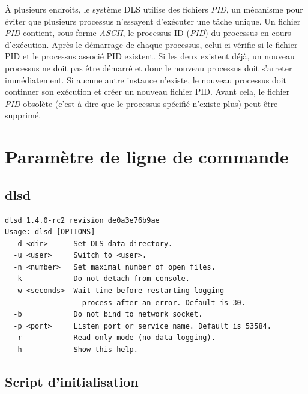\documentclass[a4paper,12pt,BCOR6mm,bibtotoc,idxtotoc]{scrbook}
\begin{document}
\`A plusieurs endroits, le syst\`eme DLS utilise des fichiers
\textit{PID}, un m\'ecanisme pour \'eviter que
plusieurs processus n'essayent d'ex\'ecuter une t\^ache unique.  Un
fichier \textit{PID} contient, sous forme \textit{ASCII}, le processus
ID (\textit{PID}) du processus en cours d'ex\'ecution.  Apr\`es le
d\'emarrage de chaque processus, celui-ci v\'erifie si le fichier PID
et le processus associ\'e PID existent.  Si les deux existent
d\'ej\`a, un nouveau processus ne doit pas \^etre d\'emarr\'e et donc
le nouveau processus doit s'arreter imm\'ediatement.  Si aucune autre
instance n'existe, le nouveau processus doit continuer son ex\'ecution
et cr\'eer un nouveau fichier PID. Avant cela, le fichier \textit{PID} obsol\`ete
(c'est-\`a-dire que le processus sp\'ecifi\'e n'existe plus) peut \^etre supprim\'e.


\chapter{Param\`etre de ligne de commande}


\section{dlsd}

\begin{lstlisting}
dlsd 1.4.0-rc2 revision de0a3e76b9ae
Usage: dlsd [OPTIONS]
  -d <dir>      Set DLS data directory.
  -u <user>     Switch to <user>.
  -n <number>   Set maximal number of open files.
  -k            Do not detach from console.
  -w <seconds>  Wait time before restarting logging
                  process after an error. Default is 30.
  -b            Do not bind to network socket.
  -p <port>     Listen port or service name. Default is 53584.
  -r            Read-only mode (no data logging).
  -h            Show this help.
\end{lstlisting}


\section{Script d'initialisation}
\end{document}
